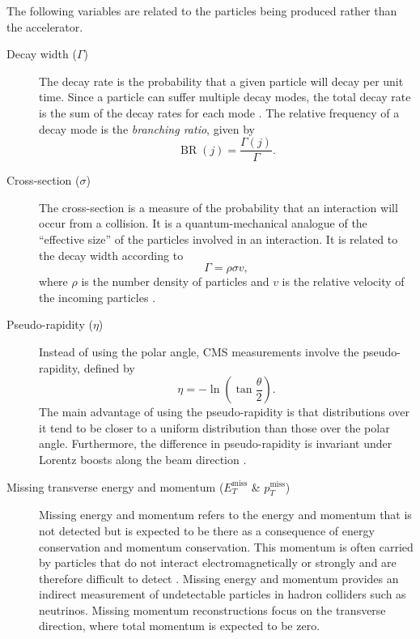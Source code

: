 The following variables are related to the particles being produced rather than the accelerator.
\begin{description}
    \item[Decay width ($\Gamma$)] The decay rate is the probability that a given particle will decay per unit time. Since a particle can suffer multiple decay modes, the total decay rate is the sum of the decay rates for each mode \cite{thomson_modern_2013}. The relative frequency of a decay mode is the \textit{branching ratio}, given by
    \begin{equation}
        \operatorname{BR}(j) = \frac{\Gamma(j)}{\Gamma}.
    \end{equation}
    
    \item[Cross-section ($\sigma$)] The cross-section is a measure of the probability that an interaction will occur from a collision. It is a quantum-mechanical analogue of the ``effective size'' of the particles involved in an interaction. It is related to the decay width according to
    \begin{equation}
        \Gamma = \rho\sigma v,
    \end{equation}
    where $\rho$ is the number density of particles and $v$ is the relative velocity of the incoming particles \cite{thomson_modern_2013}.
    
    \item[Pseudo-rapidity ($\eta$)] Instead of using the polar angle, CMS measurements involve the pseudo-rapidity, defined by
    \begin{equation}
        \eta = - \ln(\tan{\frac{\theta}{2}}).
    \end{equation}
    The main advantage of using the pseudo-rapidity is that distributions over it tend to be closer to a uniform distribution than those over the polar angle. Furthermore, the difference in pseudo-rapidity is invariant under Lorentz boosts along the beam direction \cite{thomson_modern_2013}.
    
    \item[Missing transverse energy and momentum ($E^{\mathrm{miss}}_T$ \& $p^{\mathrm{miss}}_T$)]
    Missing energy and momentum refers to the energy and momentum that is not detected but is expected to be there as a consequence of energy conservation and momentum conservation. This momentum is often carried by particles that do not interact electromagnetically or strongly and are therefore difficult to detect \cite{thomson_modern_2013}. Missing energy and momentum provides an indirect measurement of undetectable particles in hadron colliders such as neutrinos. Missing momentum reconstructions focus on the transverse direction, where total momentum is expected to be zero.
    
\end{description}